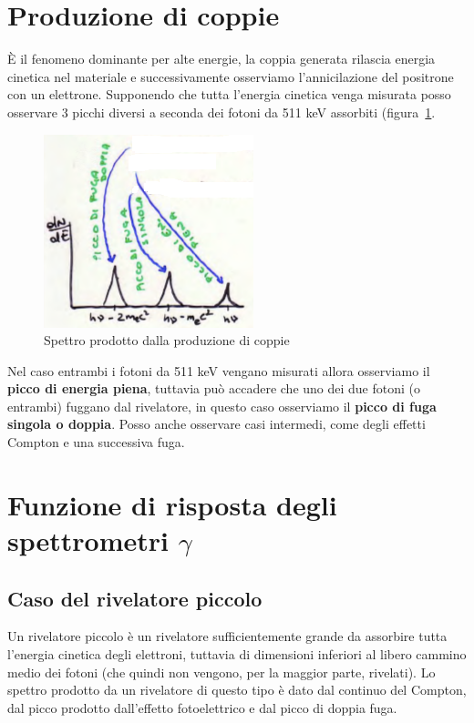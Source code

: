 \section{Produzione di coppie}
\`E il fenomeno dominante per alte energie, la coppia generata rilascia energia cinetica nel materiale e successivamente osserviamo l'annicilazione del positrone con
un elettrone.
Supponendo che tutta l'energia cinetica venga misurata posso osservare 3 picchi diversi a seconda dei fotoni da 511 keV assorbiti (figura~\ref{fig:spettroCoppia}.
\begin{figure}[htbp]
\begin{center}
\includegraphics[scale=1]{./Immagini/SpettroCoppia.png}
\caption{Spettro prodotto dalla produzione di coppie}
\label{fig:spettroCoppia}
\end{center}
\end{figure}
Nel caso entrambi i fotoni da 511 keV vengano misurati allora osserviamo il \textbf{picco di energia piena}, tuttavia pu\`o accadere che uno dei due fotoni (o entrambi)
fuggano dal rivelatore, in questo caso osserviamo il \textbf{picco di fuga singola o doppia}.
Posso anche osservare casi intermedi, come degli effetti Compton e una successiva fuga.
\section{Funzione di risposta degli spettrometri $\gamma$}
\subsection{Caso del rivelatore piccolo}
Un rivelatore piccolo \`e un rivelatore sufficientemente grande da assorbire tutta l'energia cinetica degli elettroni, tuttavia di dimensioni inferiori al libero cammino
medio dei fotoni (che quindi non vengono, per la maggior parte, rivelati).
Lo spettro prodotto da un rivelatore di questo tipo \`e dato dal continuo del Compton, dal picco prodotto dall'effetto fotoelettrico e dal picco di doppia fuga.
